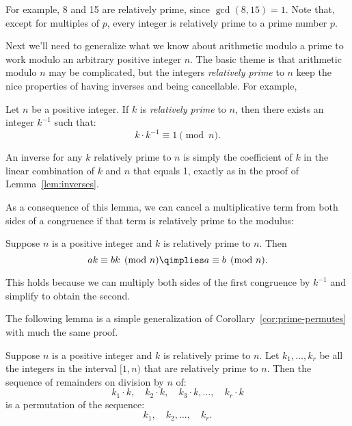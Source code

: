 For example, 8 and 15 are relatively prime, since $\gcd(8, 15) = 1$.
Note that, except for multiples of $p$, every integer is relatively
prime to a prime number $p$.

Next we'll need to generalize what we know about arithmetic modulo a
prime to work modulo an arbitrary positive integer $n$.  The basic
theme is that arithmetic modulo $n$ may be complicated, but the
integers \emph{relatively prime} to $n$ keep the nice properties of
having inverses and being cancellable.  For example,
\begin{lemma}
\label{lem:inverse-arb}
Let $n$ be a positive integer.  If $k$ is \emph{relatively prime} to
$n$, then there exists an integer $k^{-1}$ such that:
\[
k \cdot k^{-1} \equiv 1 \pmod{n}.
\]
\end{lemma}
An inverse for any $k$ relatively prime to $n$ is simply the
coefficient of $k$ in the linear combination of $k$ and $n$ that
equals 1, exactly as in the proof of Lemma~\ref{lem:inverses}.

\iffalse
\begin{proof}
There exist integers $s$ and $t$ such that $s k + t n = \gcd(k, n) =
1$ by Theorem~\ref{th:gcd}.  Rearranging terms gives $tn = 1 - sk$,
which implies that $n \divides 1 - sk$ and $sk \equiv 1 \pmod{n}$.  Define
$k^{-1}$ to be $s$.
\end{proof}
\fi

As a consequence of this lemma, we can cancel a multiplicative term
from both sides of a congruence if that term is relatively prime to
the modulus:
\begin{corollary}
\label{cor:cancellation-arb}
Suppose $n$ is a positive integer and $k$ is relatively prime to $n$.  Then
\[
a k \equiv b k \pmod{n} \qimplies a \equiv b \pmod{n}.
\]
\end{corollary}

This holds because we can multiply both sides of the first congruence
by $k^{-1}$ and simplify to obtain the second.

The following lemma is a simple generalization of
Corollary~\ref{cor:prime-permutes} with much the same proof.
\begin{lemma}
\label{lem:permutes-arb}
Suppose $n$ is a positive integer and $k$ is relatively prime to $n$.
Let $k_1, \dots, k_r$ be all the integers in the interval
$[1,n)$ that are relatively prime to $n$.  Then the sequence of
  remainders on division by $n$ of:
%
\[
k_1 \cdot k,\quad
k_2 \cdot k,\quad
k_3 \cdot k, \dots,\quad
k_r \cdot k
\]
is a permutation of the sequence:
\[
k_1,\quad k_2, \dots,\quad k_r.
\]
\end{lemma}

